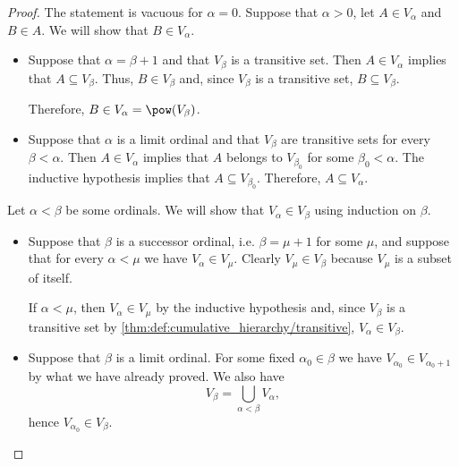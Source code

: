 \begin{proof}
   The statement is vacuous for \( \alpha = 0 \). Suppose that \( \alpha > 0 \), let \( A \in V_\alpha \) and \( B \in A \). We will show that \( B \in V_\alpha \).
  \begin{itemize}
    \item Suppose that \( \alpha = \beta + 1 \) and that \( V_\beta \) is a transitive set. Then \( A \in V_\alpha \) implies that \( A \subseteq V_\beta \). Thus, \( B \in V_\beta \) and, since \( V_\beta \) is a transitive set, \( B \subseteq V_\beta \).

    Therefore, \( B \in V_\alpha = \pow(V_\beta) \).

    \item Suppose that \( \alpha \) is a limit ordinal and that \( V_\beta \) are transitive sets for every \( \beta < \alpha \). Then \( A \in V_\alpha \) implies that \( A \) belongs to \( V_{\beta_0} \) for some \( \beta_0 < \alpha \). The inductive hypothesis implies that \( A \subseteq V_{\beta_0} \). Therefore, \( A \subseteq V_\alpha \).
  \end{itemize}

   Let \( \alpha < \beta \) be some ordinals. We will show that \( V_\alpha \in V_\beta \) using induction on \( \beta \).
  \begin{itemize}
    \item Suppose that \( \beta \) is a successor ordinal, i.e. \( \beta = \mu + 1 \) for some \( \mu \), and suppose that for every \( \alpha < \mu \) we have \( V_\alpha \in V_\mu \). Clearly \( V_\mu \in V_\beta \) because \( V_\mu \) is a subset of itself.

    If \( \alpha < \mu \), then \( V_\alpha \in V_\mu \) by the inductive hypothesis and, since \( V_\beta \) is a transitive set by \cref{thm:def:cumulative_hierarchy/transitive}, \( V_\alpha \in V_\beta \).

    \item Suppose that \( \beta \) is a limit ordinal. For some fixed \( \alpha_0 \in \beta \) we have \( V_{\alpha_0} \in V_{\alpha_0 + 1} \) by what we have already proved. We also have
    \begin{equation*}
      V_\beta
      =
      \bigcup_{\alpha < \beta} V_\alpha,
    \end{equation*}
    hence \( V_{\alpha_0} \in V_\beta \).
  \end{itemize}


\end{proof}
